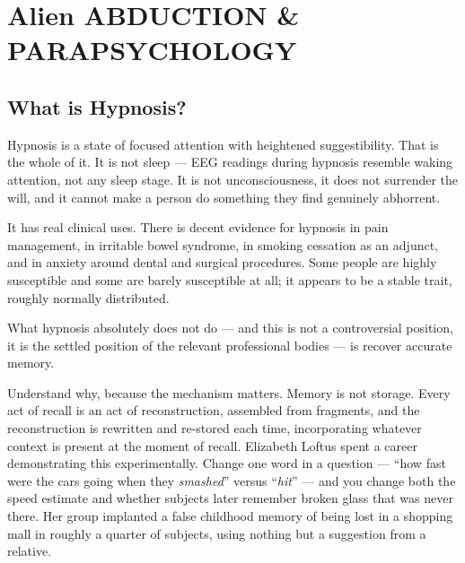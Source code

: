 \chapter{Alien ABDUCTION \& PARAPSYCHOLOGY}\label{ch:abduction}


\section{What is Hypnosis?}\label{sec:hypnosis}

Hypnosis is a state of focused attention with heightened suggestibility. That is the whole of
it. It is not sleep --- EEG readings during hypnosis resemble waking attention, not any sleep
stage. It is not unconsciousness, it does not surrender the will, and it cannot make a person
do something they find genuinely abhorrent. 

It has real clinical uses. There is decent evidence for hypnosis in pain management, in
irritable bowel syndrome, in smoking cessation as an adjunct, and in anxiety around dental and
surgical procedures. Some people are highly susceptible and some are barely susceptible at
all; it appears to be a stable trait, roughly normally distributed.

What hypnosis absolutely does not do --- and this is not a controversial position, it is the
settled position of the relevant professional bodies --- is recover accurate memory.

Understand why, because the mechanism matters. Memory is not storage.  Every act of recall is an act of reconstruction,
assembled from fragments, and the reconstruction is rewritten and re-stored each time,
incorporating whatever context is present at the moment of recall. Elizabeth Loftus spent a
career demonstrating this experimentally. Change one word in a question --- ``how fast were
the cars going when they \emph{smashed}'' versus ``\emph{hit}'' --- and you change both the
speed estimate and whether subjects later remember broken glass that was never there. Her
group implanted a false childhood memory of being lost in a shopping mall in roughly a
quarter of subjects, using nothing but a suggestion from a relative.

